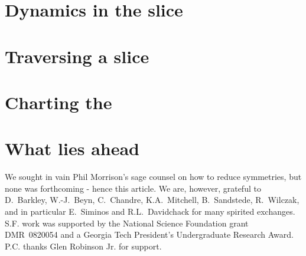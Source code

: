 \documentclass[final,3p,times]{elsarticle}	%
\begin{document}
\section{\Mframes}
    \label{sec:frame}
    

\section{Dynamics in the slice}
    \label{sec:mslices}
    

\section{Traversing a slice {\sset}}
	\label{sec:singul}
    

\section{Charting the \reducedsp}
	\label{sec:chart}
    

\section{What lies ahead} %
    \label{sec:concl}
    

	\medskip
We sought in vain Phil Morrison's sage counsel on how
to reduce symmetries, but none was forthcoming - hence this article.
We are, however, grateful to
D.~Barkley,
W.-J.~Beyn,
C.~Chandre,
K.A.~Mitchell,
B.~Sandstede,
R.~Wilczak,
and in particular E.~Siminos and R.L.~Davidchack
for many spirited exchanges.
S.F. work was supported by the National Science Foundation
grant DMR~0820054 and a Georgia Tech President's Undergraduate
Research Award.
P.C. thanks Glen Robinson Jr. for support. 	




\ifboyscout
\newpage
\fi
\PublicPrivate{}{

	} %
\end{document}
